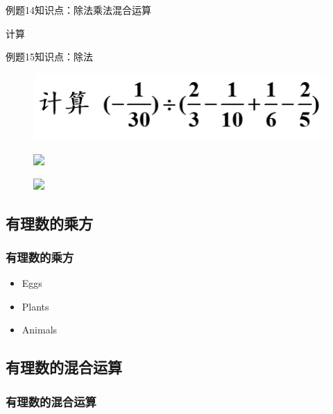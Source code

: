 \begin{frame}{例题14}{知识点：除法乘法混合运算}
    \begin{block}{计算}
        \\

    \end{block}
\end{frame}

\begin{frame}{例题15}{知识点：除法}
    \begin{figure}
        \flushleft
        \includegraphics[width=.45\textwidth]{assets/examp14.png}
    \end{figure}
            \begin{figure}
                \includegraphics<2>[width=.99\textwidth]{assets/examp14-1.png}
            \end{figure}
            
            \begin{figure}
                \includegraphics<3>[width=.89\textwidth]{assets/examp14-2.png}
            \end{figure}
\end{frame}


\subsection{有理数的乘方}
\begin{frame}
    \frametitle{有理数的乘方}

        \begin{itemize}
        \item<1-> Eggs
        \item<2-> Plants
        \item<3-> Animals
        \end{itemize}

        
        
        
\end{frame}

\subsection{有理数的混合运算}
\begin{frame}
    \frametitle{有理数的混合运算}
\end{frame}
